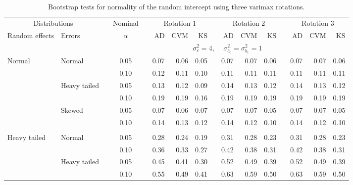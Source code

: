 \documentclass{article} %
\begin{document}
\begin{table}[ht]
\begin{scriptsize}
\begin{center}
\begin{tabular}{ll p{.1cm} c p{.1cm} rrr p{.1cm} rrr p{.1cm} rrr}
   \hline
\end{tabular}
\end{center}
\end{scriptsize}
\end{table}

\begin{table}[ht]
\caption{Bootstrap tests for normality of the random intercept using three varimax rotations.}
\begin{scriptsize}
\begin{center}
\begin{tabular}{ll p{.1cm} c p{.1cm} rrr p{.1cm} rrr p{.1cm} rrr}
  \hline
  \multicolumn{2}{c}{Distributions}& & Nominal & &  \multicolumn{3}{c}{Rotation 1} & & \multicolumn{3}{c}{Rotation 2} & & \multicolumn{3}{c}{Rotation 3}\\ \cline{1-2} \cline{6-8} \cline{10-12} \cline{14-16}
  Random effects & Errors & & $\alpha$ & & AD & CVM & KS & & AD & CVM & KS & & AD & CVM & KS \\ 
   \hline
& && && \multicolumn{9}{c}{$\sigma_{\varepsilon}^2 = 4$, \ \ $\sigma_{b_0}^2 = \sigma_{b_1}^2 = 1$} \\ \cline{6-16}
Normal       & Normal       && 0.05 &&  0.07 & 0.06 & 0.05 && 0.07 & 0.07 & 0.06 && 0.07 & 0.07 & 0.06 \\ 
             &              && 0.10 &&  0.12 & 0.11 & 0.10 && 0.11 & 0.11 & 0.11 && 0.11 & 0.11 & 0.11 \\ 
             & Heavy tailed && 0.05 &&  0.13 & 0.12 & 0.09 && 0.14 & 0.13 & 0.12 && 0.14 & 0.13 & 0.12 \\ 
             &              && 0.10 &&  0.19 & 0.19 & 0.16 && 0.19 & 0.19 & 0.19 && 0.19 & 0.19 & 0.19 \\ 
             & Skewed       && 0.05 &&  0.07 & 0.06 & 0.07 && 0.07 & 0.07 & 0.05 && 0.07 & 0.07 & 0.05 \\ 
             &              && 0.10 &&  0.14 & 0.13 & 0.12 && 0.14 & 0.12 & 0.10 && 0.14 & 0.12 & 0.10 \\ 
             &&&&&&&&&&&&&&&\\
Heavy tailed & Normal       && 0.05 &&  0.28 & 0.24 & 0.19 && 0.31 & 0.28 & 0.23 && 0.31 & 0.28 & 0.23 \\ 
             &              && 0.10 &&  0.36 & 0.33 & 0.27 && 0.42 & 0.38 & 0.31 && 0.42 & 0.38 & 0.31 \\ 
             & Heavy tailed && 0.05 &&  0.45 & 0.41 & 0.30 && 0.52 & 0.49 & 0.39 && 0.52 & 0.49 & 0.39 \\ 
             &              && 0.10 &&  0.55 & 0.49 & 0.41 && 0.63 & 0.59 & 0.50 && 0.63 & 0.59 & 0.50 \\ 

\end{tabular}
\end{center}
\end{scriptsize}
\end{table}
\end{document}

